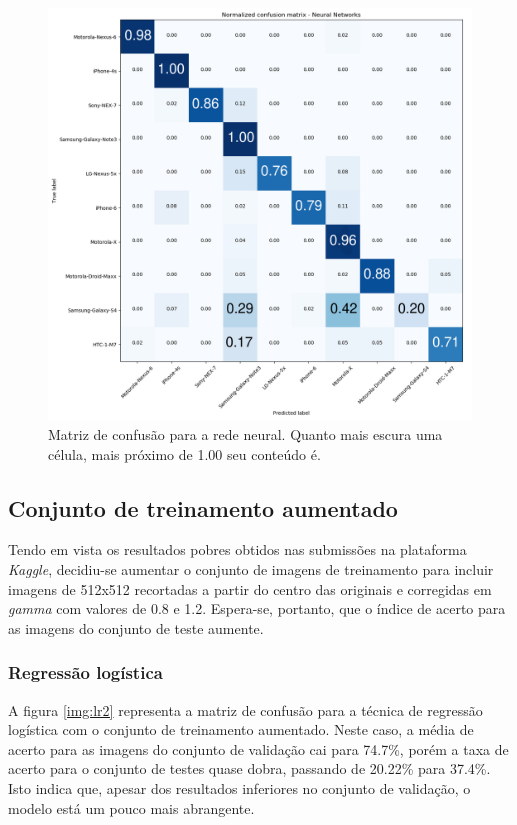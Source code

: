 \documentclass[10pt,twocolumn,letterpaper]{article}
\begin{document}
\begin{figure}
    \centering
    \includegraphics[width=\columnwidth]{images/nn-no_crop.png}
    \caption{Matriz de confusão para a rede neural. Quanto mais escura uma célula, mais próximo de 1.00 seu conteúdo é.}
    \label{img:nn1}
\end{figure}

\subsection {Conjunto de treinamento aumentado}

Tendo em vista os resultados pobres obtidos nas submissões na plataforma \textit{Kaggle}, decidiu-se aumentar o conjunto de imagens de treinamento para incluir imagens de 512x512 recortadas a partir do centro das originais e corregidas em \textit{gamma} com valores de 0.8 e 1.2. Espera-se, portanto, que o índice de acerto para as imagens do conjunto de teste aumente.

\subsubsection {Regressão logística}

A figura \ref{img:lr2} representa a matriz de confusão para a técnica de regressão logística com o conjunto de treinamento aumentado. Neste caso, a média de acerto para as imagens do conjunto de validação cai para 74.7\%, porém a taxa de acerto para o conjunto de testes quase dobra, passando de 20.22\% para 37.4\%. Isto indica que, apesar dos resultados inferiores no conjunto de validação, o modelo está um pouco mais abrangente.
\end{document}
